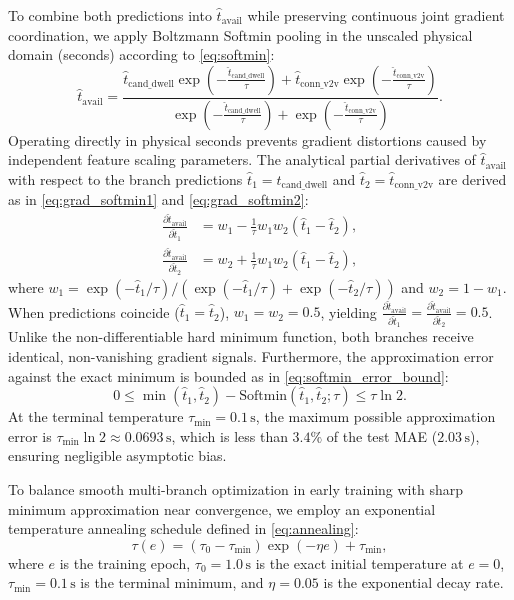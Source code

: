 \documentclass[journal]{IEEEtran}
\begin{document}
To combine both predictions into $\hat{t}_{\text{avail}}$ while preserving continuous joint gradient coordination, we apply Boltzmann Softmin pooling in the unscaled physical domain (seconds) according to \eqref{eq:softmin}:
\begin{equation}
\hat{t}_{\text{avail}} = \frac{\hat{t}_{\text{cand\_dwell}} \exp\!\left(-\frac{\hat{t}_{\text{cand\_dwell}}}{\tau}\right) + \hat{t}_{\text{conn\_v2v}} \exp\!\left(-\frac{\hat{t}_{\text{conn\_v2v}}}{\tau}\right)}{\exp\!\left(-\frac{\hat{t}_{\text{cand\_dwell}}}{\tau}\right) + \exp\!\left(-\frac{\hat{t}_{\text{conn\_v2v}}}{\tau}\right)}.
\label{eq:softmin}
\end{equation}
Operating directly in physical seconds prevents gradient distortions caused by independent feature scaling parameters. The analytical partial derivatives of $\hat{t}_{\text{avail}}$ with respect to the branch predictions $\hat{t}_1 = \hat{t}_{\text{cand\_dwell}}$ and $\hat{t}_2 = \hat{t}_{\text{conn\_v2v}}$ are derived as in \eqref{eq:grad_softmin1} and \eqref{eq:grad_softmin2}:
\begin{align}
\frac{\partial \hat{t}_{\text{avail}}}{\partial \hat{t}_1} &= w_1 - \frac{1}{\tau} w_1 w_2 (\hat{t}_1 - \hat{t}_2), \label{eq:grad_softmin1} \\
\frac{\partial \hat{t}_{\text{avail}}}{\partial \hat{t}_2} &= w_2 + \frac{1}{\tau} w_1 w_2 (\hat{t}_1 - \hat{t}_2), \label{eq:grad_softmin2}
\end{align}
where $w_1 = \exp(-\hat{t}_1/\tau) / (\exp(-\hat{t}_1/\tau) + \exp(-\hat{t}_2/\tau))$ and $w_2 = 1 - w_1$. When predictions coincide ($\hat{t}_1 = \hat{t}_2$), $w_1 = w_2 = 0.5$, yielding $\frac{\partial \hat{t}_{\text{avail}}}{\partial \hat{t}_1} = \frac{\partial \hat{t}_{\text{avail}}}{\partial \hat{t}_2} = 0.5$. Unlike the non-differentiable hard minimum function, both branches receive identical, non-vanishing gradient signals. Furthermore, the approximation error against the exact minimum is bounded as in \eqref{eq:softmin_error_bound}:
\begin{equation}
0 \le \min(\hat{t}_1, \hat{t}_2) - \text{Softmin}(\hat{t}_1, \hat{t}_2; \tau) \le \tau \ln 2.
\label{eq:softmin_error_bound}
\end{equation}
At the terminal temperature $\tau_{\text{min}} = 0.1\,\text{s}$, the maximum possible approximation error is $\tau_{\text{min}} \ln 2 \approx 0.0693\,\text{s}$, which is less than $3.4\%$ of the test MAE ($2.03\,\text{s}$), ensuring negligible asymptotic bias.

To balance smooth multi-branch optimization in early training with sharp minimum approximation near convergence, we employ an exponential temperature annealing schedule defined in \eqref{eq:annealing}:
\begin{equation}
\tau(e) = (\tau_0 - \tau_{\text{min}}) \exp(-\eta e) + \tau_{\text{min}},
\label{eq:annealing}
\end{equation}
where $e$ is the training epoch, $\tau_0 = 1.0\,\text{s}$ is the exact initial temperature at $e=0$, $\tau_{\text{min}} = 0.1\,\text{s}$ is the terminal minimum, and $\eta = 0.05$ is the exponential decay rate.
\end{document}
